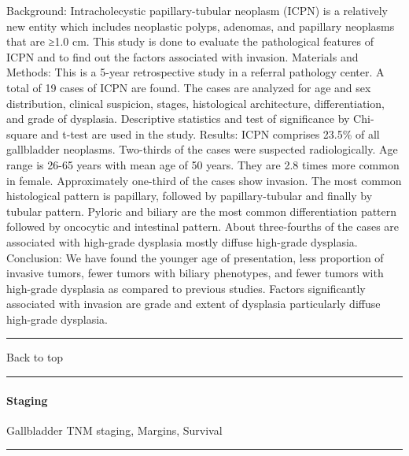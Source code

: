 \documentclass[]{article}
\let\oldparagraph\paragraph
\renewcommand{\paragraph}[1]{\oldparagraph{#1}\mbox{}}
\begin{document}
Background: Intracholecystic papillary-tubular neoplasm (ICPN) is a
relatively new entity which includes neoplastic polyps, adenomas, and
papillary neoplasms that are ≥1.0 cm. This study is done to evaluate the
pathological features of ICPN and to find out the factors associated
with invasion. Materials and Methods: This is a 5-year retrospective
study in a referral pathology center. A total of 19 cases of ICPN are
found. The cases are analyzed for age and sex distribution, clinical
suspicion, stages, histological architecture, differentiation, and grade
of dysplasia. Descriptive statistics and test of significance by
Chi-square and t-test are used in the study. Results: ICPN comprises
23.5\% of all gallbladder neoplasms. Two-thirds of the cases were
suspected radiologically. Age range is 26-65 years with mean age of 50
years. They are 2.8 times more common in female. Approximately one-third
of the cases show invasion. The most common histological pattern is
papillary, followed by papillary-tubular and finally by tubular pattern.
Pyloric and biliary are the most common differentiation pattern followed
by oncocytic and intestinal pattern. About three-fourths of the cases
are associated with high-grade dysplasia mostly diffuse high-grade
dysplasia. Conclusion: We have found the younger age of presentation,
less proportion of invasive tumors, fewer tumors with biliary
phenotypes, and fewer tumors with high-grade dysplasia as compared to
previous studies. Factors significantly associated with invasion are
grade and extent of dysplasia particularly diffuse high-grade dysplasia.

{}

{}

\begin{center}\rule{0.5\linewidth}{\linethickness}\end{center}

Back to top

\begin{center}\rule{0.5\linewidth}{\linethickness}\end{center}

\pagebreak

\hypertarget{staging-2}{%
\paragraph{Staging}\label{staging-2}}

Gallbladder TNM staging, Margins, Survival

\begin{center}\rule{0.5\linewidth}{\linethickness}\end{center}
\end{document}
